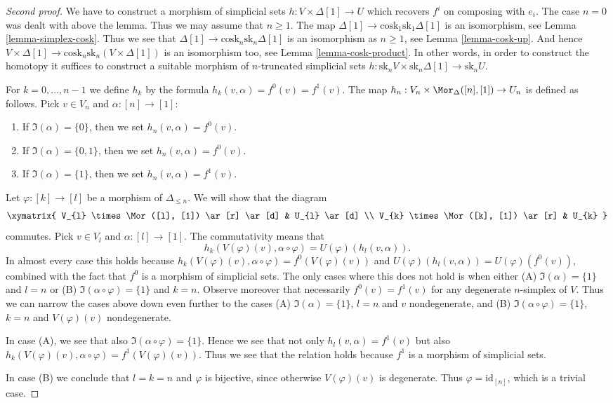 \begin{proof}[Second proof]
We have to construct a morphism of simplicial sets
$h : V \times \Delta[1] \to U$ which recovers $f^i$ on composing with $e_i$.
The case $n = 0$ was dealt with above the lemma.
Thus we may assume that $n \geq 1$.
The map $\Delta[1] \to \text{cosk}_1 \text{sk}_1 \Delta[1]$
is an isomorphism, see Lemma \ref{lemma-simplex-cosk}.
Thus we see that $\Delta[1] \to \text{cosk}_n \text{sk}_n \Delta[1]$
is an isomorphism as $n \geq 1$, see
Lemma \ref{lemma-cosk-up}. And hence $V \times \Delta[1] \to
\text{cosk}_n \text{sk}_n (V \times \Delta[1])$
is an isomorphism too, see Lemma \ref{lemma-cosk-product}.
In other words, in order to construct the homotopy
it suffices to construct a suitable
morphism of $n$-truncated simplicial sets
$h : \text{sk}_n V \times \text{sk}_n \Delta[1] \to \text{sk}_n U$.

\medskip\noindent
For $k = 0, \ldots, n - 1$ we define $h_k$ by the
formula $h_k(v, \alpha) = f^0(v) = f^1(v)$.
The map $h_n : V_n \times \Mor_{\Delta}([n], [1]) \to U_n$
is defined as follows. Pick $v \in V_n$ and $\alpha : [n] \to [1]$:
\begin{enumerate}
\item If $\Im(\alpha) = \{0\}$, then we set $h_n(v, \alpha) = f^0(v)$.
\item If $\Im(\alpha) = \{0, 1\}$, then we set $h_n(v, \alpha) = f^0(v)$.
\item If $\Im(\alpha) = \{1\}$, then we set $h_n(v, \alpha) = f^1(v)$.
\end{enumerate}
Let $\varphi : [k] \to [l]$ be a morphism of $\Delta_{\leq n}$.
We will show that the diagram
$$
\xymatrix{
V_{l} \times \Mor([l], [1]) \ar[r] \ar[d] & U_{l} \ar[d] \\
V_{k} \times \Mor([k], [1]) \ar[r] & U_{k}
}
$$
commutes.
Pick $v \in V_{l}$ and $\alpha : [l] \to [1]$.
The commutativity means that
$$
h_k(V(\varphi)(v), \alpha \circ \varphi)
=
U(\varphi)(h_l(v, \alpha)).
$$
In almost every case this holds because
$h_k(V(\varphi)(v), \alpha \circ \varphi) = f^0(V(\varphi)(v))$
and $U(\varphi)(h_l(v, \alpha)) = U(\varphi)(f^0(v))$, combined
with the fact that $f^0$ is a morphism of simplicial sets.
The only cases where this does not hold is when
either (A) $\Im(\alpha) = \{1\}$ and $l = n$
or (B) $\Im(\alpha \circ \varphi) = \{1\}$ and $k = n$.
Observe moreover that necessarily $f^0(v) = f^1(v)$
for any degenerate $n$-simplex of $V$.
Thus we can narrow the cases above down even further
to the cases (A) $\Im(\alpha) = \{1\}$, $l = n$
and $v$ nondegenerate, and (B)
$\Im(\alpha \circ \varphi) = \{1\}$, $k = n$
and $V(\varphi)(v)$ nondegenerate.

\medskip\noindent
In case (A), we see that also $\Im(\alpha \circ \varphi) = \{1\}$.
Hence we see that not only $h_l(v, \alpha) = f^1(v)$ but also
$h_k(V(\varphi)(v), \alpha \circ \varphi) = f^1(V(\varphi)(v))$.
Thus we see that the relation holds because $f^1$ is a morphism
of simplicial sets.

\medskip\noindent
In case (B) we conclude that $l = k = n$ and
$\varphi$ is bijective, since otherwise $V(\varphi)(v)$
is degenerate. Thus $\varphi = \text{id}_{[n]}$, which is a trivial case.
\end{proof}